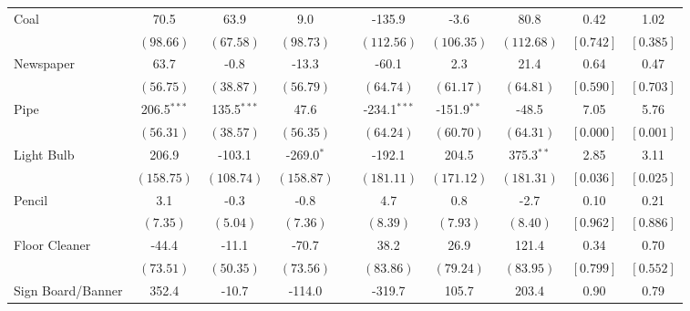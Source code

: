 \begin{tabular}{lccccccccc}
 \multirow{2}{*}{Coal}  &   70.5 &   63.9 &    9.0 &  & -135.9 &   -3.6 &   80.8 &   0.42 &   1.02 \\ 
 & $ \left( 98.66\right) $  & $ \left( 67.58\right) $  & $ \left( 98.73\right) $ &  & $ \left(112.56\right) $  & $ \left(106.35\right) $  & $ \left(112.68\right) $  & $ \left[ 0.742\right] $  & $ \left[ 0.385\right] $  \\ [0.25em] 
 \multirow{2}{*}{Newspaper}  &   63.7 &   -0.8 &  -13.3 &  &  -60.1 &    2.3 &   21.4 &   0.64 &   0.47 \\ 
 & $ \left( 56.75\right) $  & $ \left( 38.87\right) $  & $ \left( 56.79\right) $ &  & $ \left( 64.74\right) $  & $ \left( 61.17\right) $  & $ \left( 64.81\right) $  & $ \left[ 0.590\right] $  & $ \left[ 0.703\right] $  \\ [0.25em] 
 \multirow{2}{*}{Pipe}  &  206.5$^{***}$ &  135.5$^{***}$ &   47.6 &  & -234.1$^{***}$ & -151.9$^{**}$ &  -48.5 &   7.05 &   5.76 \\ 
 & $ \left( 56.31\right) $  & $ \left( 38.57\right) $  & $ \left( 56.35\right) $ &  & $ \left( 64.24\right) $  & $ \left( 60.70\right) $  & $ \left( 64.31\right) $  & $ \left[ 0.000\right] $  & $ \left[ 0.001\right] $  \\ [0.25em] 
 \multirow{2}{*}{Light Bulb}  &  206.9 & -103.1 & -269.0$^{*}$ &  & -192.1 &  204.5 &  375.3$^{**}$ &   2.85 &   3.11 \\ 
 & $ \left(158.75\right) $  & $ \left(108.74\right) $  & $ \left(158.87\right) $ &  & $ \left(181.11\right) $  & $ \left(171.12\right) $  & $ \left(181.31\right) $  & $ \left[ 0.036\right] $  & $ \left[ 0.025\right] $  \\ [0.25em] 
 \multirow{2}{*}{Pencil}  &    3.1 &   -0.3 &   -0.8 &  &    4.7 &    0.8 &   -2.7 &   0.10 &   0.21 \\ 
 & $ \left(  7.35\right) $  & $ \left(  5.04\right) $  & $ \left(  7.36\right) $ &  & $ \left(  8.39\right) $  & $ \left(  7.93\right) $  & $ \left(  8.40\right) $  & $ \left[ 0.962\right] $  & $ \left[ 0.886\right] $  \\ [0.25em] 
 \multirow{2}{*}{Floor Cleaner}  &  -44.4 &  -11.1 &  -70.7 &  &   38.2 &   26.9 &  121.4 &   0.34 &   0.70 \\ 
 & $ \left( 73.51\right) $  & $ \left( 50.35\right) $  & $ \left( 73.56\right) $ &  & $ \left( 83.86\right) $  & $ \left( 79.24\right) $  & $ \left( 83.95\right) $  & $ \left[ 0.799\right] $  & $ \left[ 0.552\right] $  \\ [0.25em] 
 \multirow{2}{*}{Sign Board/Banner}  &  352.4 &  -10.7 & -114.0 &  & -319.7 &  105.7 &  203.4 &   0.90 &   0.79 \\ 

\end{tabular}
